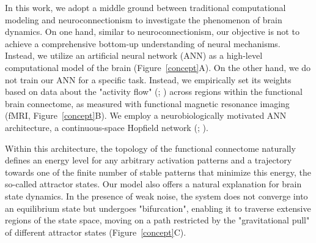\documentclass{article}
\begin{document}
In this work, we adopt a middle ground between traditional computational modeling and neuroconnectionism to investigate the phenomenon of brain dynamics.
On one hand, similar to neuroconnectionism, our objective is not to achieve a comprehensive bottom-up understanding of neural mechanisms. Instead, we utilize an artificial neural network (ANN) as a high-level computational model of the brain (Figure~\ref{concept}A).
On the other hand, we do not train our ANN for a specific task. Instead, we empirically set its weights based on  data about the "activity flow" (\href{https://doi.org/10.1038/nn.4406}{}; \href{https://doi.org/10.1038/s41467-017-01000-w}{}) across regions within the functional brain connectome, as measured with functional magnetic resonance imaging (fMRI, Figure~\ref{concept}B).
We employ a neurobiologically motivated ANN architecture, a continuous-space Hopfield network (\href{https://doi.org/10.1073/pnas.79.8.2554}{}; \href{https://doi.org/10.1038/s42254-023-00595-y}{}).

Within this architecture, the topology of the functional connectome naturally defines an energy level for any arbitrary activation patterns and a trajectory towards one of the finite number of stable patterns that minimize this energy, the so-called attractor states.
Our model also offers a natural explanation for brain state dynamics.
In the presence of weak noise, the system does not converge into an equilibrium state but undergoes "bifurcation", enabling it to traverse extensive regions of the state space, moving on a path restricted by the "gravitational pull" of different attractor states (Figure~\ref{concept}C).
\end{document}
